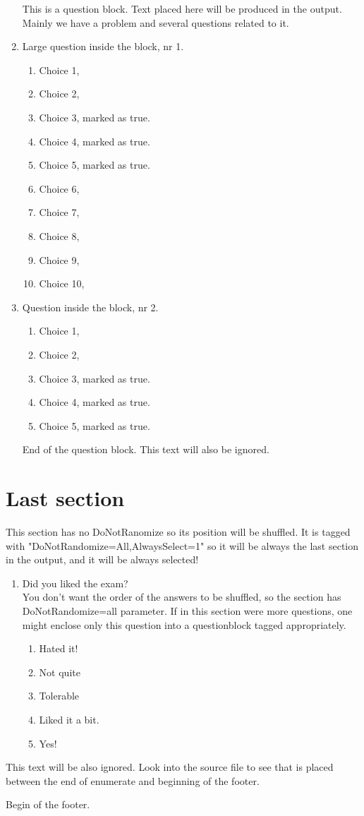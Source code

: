 \documentclass[a4paper,10pt]{article}%
\begin{document}
\begin{enumerate}[resume]
	
		This is a question block. Text placed here will be produced in the output. Mainly we have a problem and several questions related to it.
		
		\item Large question inside the block, nr 1.
		\begin{enumerate}
			\item Choice 1,
			\item Choice 2,
			\item Choice 3, marked as true. %
			\item Choice 4, marked as true. %
			\item Choice 5, marked as true. %
			\item Choice 6,
			\item Choice 7,
			\item Choice 8,
			\item Choice 9,
			\item Choice 10,
		\end{enumerate}
		\item Question inside the block, nr 2.
		\begin{enumerate}
			\item Choice 1,
			\item Choice 2,
			\item Choice 3, marked as true. %
			\item Choice 4, marked as true. %
			\item Choice 5, marked as true. %
		\end{enumerate}
	End of the question block. This text will also be ignored.
	
\end{enumerate}



\section{Last section}
This section has no DoNotRanomize so its position will be shuffled.
It is tagged with "DoNotRandomize=All,AlwaysSelect=1" so it will be always the last section in the output, and it will be always selected!
\begin{enumerate}[resume]
	\item Did you liked the exam? \\You don't want the order of the answers to be shuffled, so the section has DoNotRandomize=all parameter. If in this section were more questions, one might enclose only this question into a questionblock tagged appropriately.
	\begin{enumerate}
		\item Hated it! %
		\item Not quite
		\item Tolerable
		\item Liked it a bit.
		\item Yes!
	\end{enumerate}
\end{enumerate}

This text will be also ignored. Look into the source file to see that is placed between the end of enumerate and beginning of the footer.

Begin of the footer.
\end{document}
